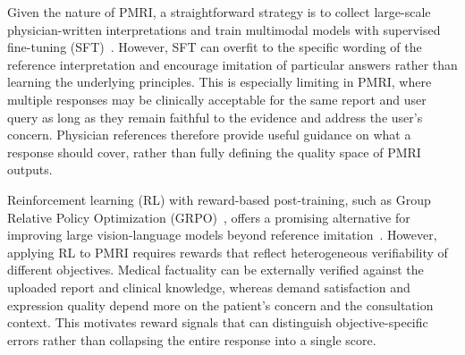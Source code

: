 \documentclass[letterpaper]{article} %
\begin{document}


Given the nature of PMRI, a straightforward strategy is to collect large-scale physician-written interpretations and train multimodal models with supervised fine-tuning (SFT)~\cite{chen2024sharegpt4v,rotstein2024fusecap}. However, SFT can overfit to the specific wording of the reference interpretation and encourage imitation of particular answers rather than learning the underlying principles. This is especially limiting in PMRI, where multiple responses may be clinically acceptable for the same report and user query as long as they remain faithful to the evidence and address the user's concern. Physician references therefore provide useful guidance on what a response should cover, rather than fully defining the quality space of PMRI outputs.


Reinforcement learning (RL) with reward-based post-training, such as Group Relative Policy Optimization (GRPO)~\cite{grpo}, offers a promising alternative for improving large vision-language models beyond reference imitation~\cite{xing2025caprl}. 
However, applying RL to PMRI requires rewards that reflect heterogeneous verifiability of different objectives. Medical factuality can be externally verified against the uploaded report and clinical knowledge, whereas demand satisfaction and expression quality depend more on the patient's concern and the consultation context. This motivates reward signals that can distinguish objective-specific errors rather than collapsing the entire response into a single score. 
\end{document}
